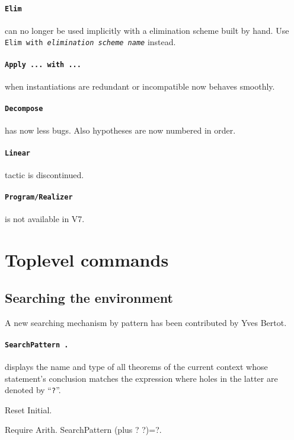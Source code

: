 \documentclass[11pt]{article}
\begin{document}
  \paragraph{{\tt Elim}} can no longer be used implicitly with a
  elimination scheme built by hand. Use {\tt Elim {\term} with
  {\it elimination scheme name}} instead.

  \paragraph{{\tt Apply ... with ...}} when instantiations are
  redundant or incompatible now behaves smoothly.

  \paragraph{{\tt Decompose}} has now less bugs. Also hypotheses
  are now numbered in order.

  \paragraph{{\tt Linear}} tactic is discontinued.

  \paragraph{{\tt Program/Realizer}} is not available in \Coq V7.

\section{Toplevel commands}

\subsection{Searching the environment}

A new searching mechanism by pattern has been contributed by Yves Bertot.


\paragraph{{\tt SearchPattern {\term}.}}
displays the name and type of all theorems of the current
context whose statement's conclusion matches the expression {\term}
where holes in the latter are denoted by ``{\tt ?}''.

\begin{coq_eval}
Reset Initial.
\end{coq_eval}
\begin{coq_example}
Require Arith.
SearchPattern (plus ? ?)=?.
\end{coq_example}
\end{document}
